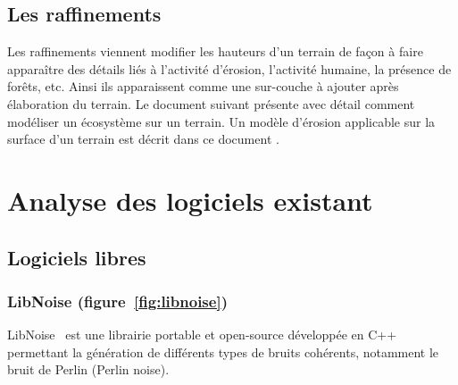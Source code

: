 \section{Les raffinements}
Les raffinements viennent modifier les hauteurs d'un terrain de façon à faire apparaître des détails liés à l'activité d'érosion, l'activité humaine, la présence de forêts, etc.
Ainsi ils apparaissent comme une sur-couche à ajouter après élaboration du terrain.\newline
Le document suivant \cite{Deus98} présente avec détail comment modéliser un écosystème sur un terrain. Un modèle d'érosion applicable sur la surface d'un terrain est décrit dans ce document \cite{Kell88}.



\chapter{Analyse des logiciels existant}
\section{Logiciels libres}
\subsection{LibNoise (figure~\ref{fig:libnoise})}
\label{ref:libnoise}

LibNoise~\cite{LibNoise} est une librairie portable et open-source développée en C++
permettant la génération de différents types de bruits cohérents, notamment
le bruit de Perlin (Perlin noise).

